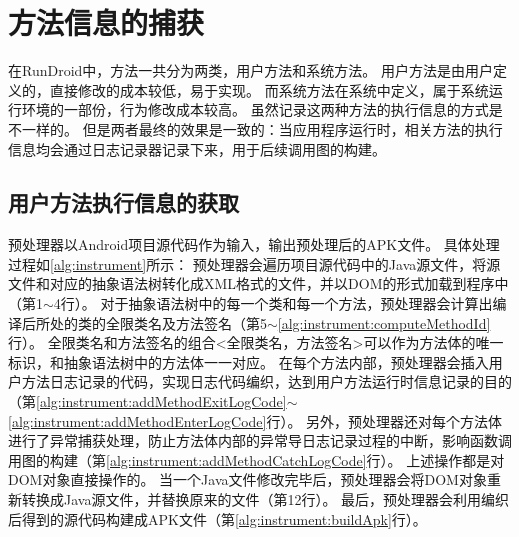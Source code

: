 



\section{方法信息的捕获}

在RunDroid中，方法一共分为两类，用户方法和系统方法。
用户方法是由用户定义的，直接修改的成本较低，易于实现。
而系统方法在系统中定义，属于系统运行环境的一部份，行为修改成本较高。
虽然记录这两种方法的执行信息的方式是不一样的。
但是两者最终的效果是一致的：当应用程序运行时，相关方法的执行信息均会通过日志记录器记录下来，用于后续调用图的构建。


\subsection{用户方法执行信息的获取}%


预处理器以Android项目源代码作为输入，输出预处理后的APK文件。
具体处理过程如\autoref{alg:instrument}所示：
预处理器会遍历项目源代码中的Java源文件，将源文件和对应的抽象语法树转化成XML格式的文件，并以DOM的形式加载到程序中（第1$\sim$4行）。
对于抽象语法树中的每一个类和每一个方法，预处理器会计算出编译后所处的类的全限类名及方法签名（第5$\sim$\ref{alg:instrument:computeMethodId}行）。
全限类名和方法签名的组合<全限类名，方法签名>可以作为方法体的唯一标识，和抽象语法树中的方法体一一对应。
在每个方法内部，预处理器会插入用户方法日志记录的代码，实现日志代码编织，达到用户方法运行时信息记录的目的（第\ref{alg:instrument:addMethodExitLogCode}$\sim$\ref{alg:instrument:addMethodEnterLogCode}行）。
另外，预处理器还对每个方法体进行了异常捕获处理，防止方法体内部的异常导日志记录过程的中断，影响函数调用图的构建（第\ref{alg:instrument:addMethodCatchLogCode}行）。
上述操作都是对DOM对象直接操作的。
当一个Java文件修改完毕后，预处理器会将DOM对象重新转换成Java源文件，并替换原来的文件（第12行）。
最后，预处理器会利用编织后得到的源代码构建成APK文件（第\ref{alg:instrument:buildApk}行）。




